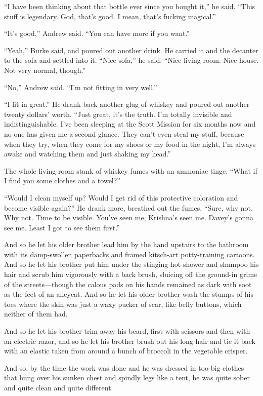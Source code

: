 ``I have been thinking about that bottle ever since you bought it,''
he said.  ``This stuff is legendary.  God, that's good.  I mean,
that's fucking magical.''

``It's good,'' Andrew said.  ``You can have more if you want.''

``Yeah,'' Burke said, and poured out another drink.  He carried it and
the decanter to the sofa and settled into it.  ``Nice sofa,'' he said. 
``Nice living room.  Nice house.  Not very normal, though.''

``No,'' Andrew said.  ``I'm not fitting in very well.''

``I fit in great.'' He drank back another glug of whiskey and poured
out another twenty dollars' worth.  ``Just great, it's the truth.  I'm
totally invisible and indistinguishable.  I've been sleeping at the
Scott Mission for six months now and no one has given me a second
glance.  They can't even steal my stuff, because when they try, when
they come for my shoes or my food in the night, I'm always awake and
watching them and just shaking my head.''

The whole living room stank of whiskey fumes with an ammoniac tinge. 
``What if I find you some clothes and a towel?''

``Would I clean myself up?  Would I get rid of this protective
coloration and become visible again?'' He drank more, breathed out the
fumes.  ``Sure, why not.  Why not.  Time to be visible.  You've seen
me, Krishna's seen me.  Davey's gonna see me.  Least I got to see them
first.''

And so he let his older brother lead him by the hand upstairs to the
bathroom with its damp-swollen paperbacks and framed kitsch-art
potty-training cartoons.  And so he let his brother put him under the
stinging hot shower and shampoo his hair and scrub him vigorously with
a back brush, sluicing off the ground-in grime of the streets---though
the calous pads on his hands remained as dark with soot as the feet of
an alleycat.  And so he let his older brother wash the stumps of his
toes where the skin was just a waxy pucker of scar, like belly
buttons, which neither of them had.

And so he let his brother trim away his beard, first with scissors and
then with an electric razor, and so he let his brother brush out his
long hair and tie it back with an elastic taken from around a bunch of
broccoli in the vegetable crisper.

And so, by the time the work was done and he was dressed in too-big
clothes that hung over his sunken chest and spindly legs like a tent,
he was quite sober and quite clean and quite different.

